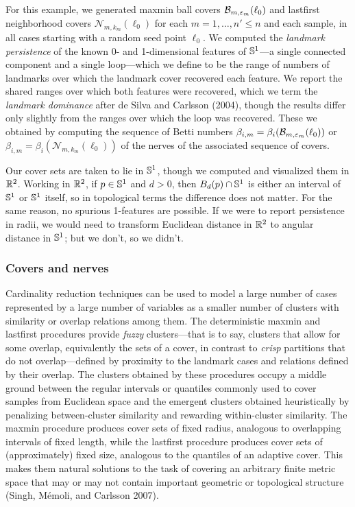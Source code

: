 \documentclass{article}
\begin{document}
For this example, we generated maxmin ball covers
\(\mathcal{B}_{m,\varepsilon_m}(\ell_0)\) and lastfirst neighborhood covers
\(\mathcal{N}_{m,k_m}(\ell_0)\) for each \(m = 1,\ldots,n' \leq n\) and
each sample, in all cases starting with a random seed point \(\ell_0\).
We computed the \emph{landmark persistence} of the known 0- and
1-dimensional features of \(\mathbb{S}^1\)---a single connected component and
a single loop---which we define to be the range of numbers of landmarks
over which the landmark cover recovered each feature. We report the
shared ranges over which both features were recovered, which we term the
\emph{landmark dominance} after de Silva and Carlsson (2004), though the
results differ only slightly from the ranges over which the loop was
recovered. These we obtained by computing the sequence of Betti numbers
\(\beta_{i,m} = \beta_i(\mathcal{B}_{m,\varepsilon_m}(\ell_0))\) or
\(\beta_{i,m} = \beta_i(\mathcal{N}_{m,k_m}(\ell_0))\) of the nerves of
the associated sequence of covers.

\begin{remark}
Our cover sets are taken to lie in $\mathbb{S}^1$, though we computed and visualized them in $\mathbb{R}^2$.
Working in $\mathbb{R}^2$, if $p \in \mathbb{S}^1$ and $d > 0$, then $B_d(p) \cap \mathbb{S}^1$ is either an interval of $\mathbb{S}^1$ or $\mathbb{S}^1$ itself, so in topological terms the difference does not matter. For the same reason, no spurious 1-features are possible.
If we were to report persistence in radii, we would need to transform Euclidean distance in $\mathbb{R}^2$ to angular distance in $\mathbb{S}^1$; but we don't, so we didn't.
\end{remark}

\hypertarget{covers-and-nerves}{%
\subsubsection{Covers and nerves}\label{covers-and-nerves}}

Cardinality reduction techniques can be used to model a large number of
cases represented by a large number of variables as a smaller number of
clusters with similarity or overlap relations among them. The
deterministic maxmin and lastfirst procedures provide \emph{fuzzy}
clusters---that is to say, clusters that allow for some overlap,
equivalently the sets of a cover, in contrast to \emph{crisp} partitions
that do not overlap---defined by proximity to the landmark cases and
relations defined by their overlap. The clusters obtained by these
procedures occupy a middle ground between the regular intervals or
quantiles commonly used to cover samples from Euclidean space and the
emergent clusters obtained heuristically by penalizing between-cluster
similarity and rewarding within-cluster similarity. The maxmin procedure
produces cover sets of fixed radius, analogous to overlapping intervals
of fixed length, while the lastfirst procedure produces cover sets of
(approximately) fixed size, analogous to the quantiles of an adaptive
cover. This makes them natural solutions to the task of covering an
arbitrary finite metric space that may or may not contain important
geometric or topological structure (Singh, Mémoli, and Carlsson 2007).
\end{document}
